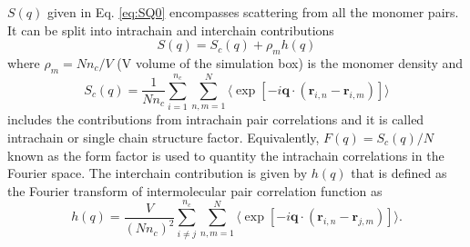 \documentclass[pre,showpacs,notitlepage,twocolumn]{revtex4-1}
\begin{document}
$S(q)$ given in Eq. \eqref{eq:SQ0} encompasses scattering from all the  monomer pairs. It can be split into intrachain and interchain  contributions
%
\begin{equation}
S(q)= S_c(q)+ \rho_m h(q)
\label{eq:SQ}
 \end{equation}
%
where $\rho_m=Nn_c/V$ (V volume of the simulation box) is the monomer density and 
%
\begin{equation}
S_c(q)= \frac{1}{N n_c} \sum_{i=1}^{n_c} \sum_{n,m=1}^{N} \langle \exp \left[-i \mathbf{q} \cdot (\mathbf{r}_{i,n} -\mathbf{r}_{i,m}) \right] \rangle\label{eq:SQ1}
 \end{equation}
%
includes the contributions from intrachain pair correlations and it is called  intrachain or single chain structure factor. Equivalently,  $F(q)=S_c(q)/N$ known as the form factor \cite{Rubinstein} is used to quantity
the intrachain correlations in the Fourier space. The interchain contribution is given by $h(q)$ that is defined as the Fourier transform of intermolecular pair correlation function \cite{Hansen} as
%
\begin{equation}
h(q)= \frac{V}{(N n_c)^2} \sum_{i\neq j}^{n_c} \sum_{n,m=1}^{N} \langle \exp \left[-i \mathbf{q} \cdot (\mathbf{r}_{i,n} -\mathbf{r}_{j,m}) \right] \rangle\label{eq:SQ2}.
 \end{equation}
%
%

%
\end{document}
